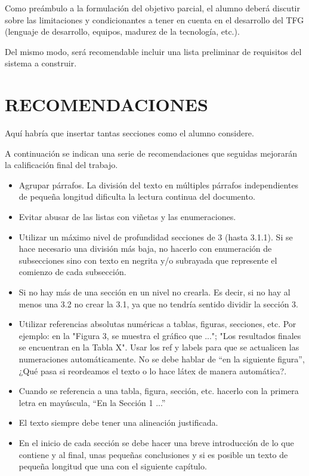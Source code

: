 \documentclass{pre-tfg}
\begin{document}
Como preámbulo a la formulación del objetivo parcial, el alumno deberá discutir sobre las
limitaciones y condicionantes a tener en cuenta en el desarrollo del TFG (lenguaje de
desarrollo, equipos, madurez de la tecnología, etc.).

Del mismo modo, será recomendable incluir una lista preliminar de requisitos del sistema a
construir.


\section{RECOMENDACIONES}

Aquí habría que insertar tantas secciones como el alumno considere.

A continuación se indican una serie de recomendaciones que seguidas mejorarán la calificación final del trabajo.

\begin{itemize}
 \item Agrupar párrafos. La división del texto en múltiples párrafos independientes de pequeña longitud dificulta la lectura continua del documento.
\item  Evitar abusar de las listas con viñetas y las enumeraciones.
\item Utilizar un máximo nivel de profundidad secciones de 3 (hasta 3.1.1). Si se hace necesario una división más baja, no hacerlo con enumeración de subsecciones sino con texto en negrita y/o subrayada que represente el comienzo de cada subsección. 
\item  Si no hay más de una sección en un nivel no crearla. Es decir, si no hay al menos una 3.2 no crear la 3.1, ya que no tendría sentido dividir la sección 3.
\item  Utilizar referencias absolutas numéricas a tablas, figuras, secciones, etc. Por ejemplo: en la "Figura 3, se muestra el gráfico que  ..."; "Los resultados finales se encuentran en la Tabla X". Usar los ref y labels para que se actualicen las numeraciones automáticamente. No se debe hablar de ``en la siguiente figura'', ¿Qué pasa si reordeamos el texto o lo hace látex de manera automática?.
\item Cuando se referencia a una tabla, figura, sección, etc. hacerlo con la primera letra en mayúscula, ``En la Sección 1 ...''
\item  El texto siempre debe tener una alineación justificada. 
\item En el inicio de cada sección se debe hacer una breve introducción de lo que contiene y al final, unas pequeñas conclusiones y si es posible un texto de pequeña longitud que una con el siguiente capítulo.
\end{itemize}
\end{document}
